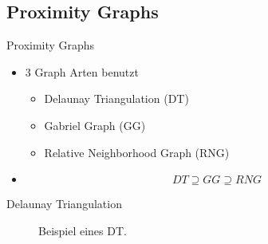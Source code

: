 \documentclass{beamer}
\begin{document}
    \subsection{Proximity Graphs}
        \begin{frame}{Proximity Graphs}
            \begin{itemize}[<+->]
                \item{ 3 Graph Arten benutzt
                    \begin{itemize}
                        \item Delaunay Triangulation (DT) \cite{Katajainen}
                        \item Gabriel Graph (GG) \cite{Gabriel1969}
                        \item Relative Neighborhood Graph (RNG) \cite{Toussaint1980}
                    \end{itemize}
                }
                \item{
                    \begin{equation}
                        DT \supseteq GG \supseteq RNG
                    \end{equation}
                }
            \end{itemize}
        \end{frame}

        \begin{frame}{Delaunay Triangulation}
            \begin{figure}[htbp]
                \centering
                
                \caption
                {
                    Beispiel eines DT.
                }
            \end{figure}
        \end{frame}
\end{document}
